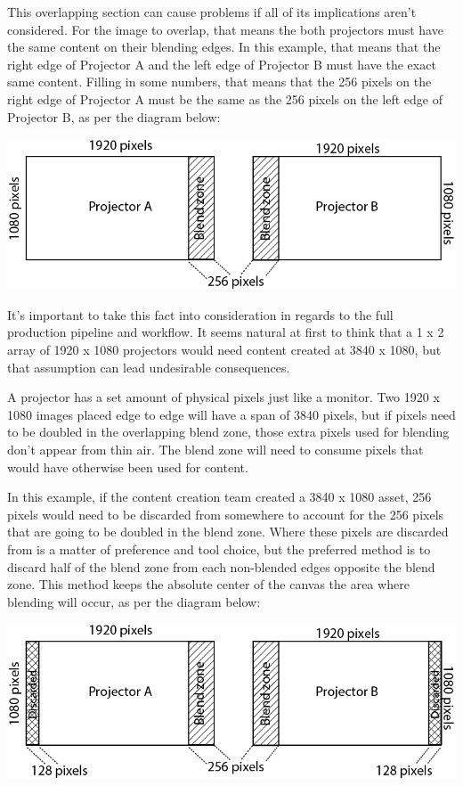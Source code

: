 \begin{fullwidth}
This overlapping section can cause problems if all of its implications aren't considered. For the image to overlap, that means the both projectors must have the same content on their blending edges. In this example, that means that the right edge of Projector A and the left edge of Projector B must have the exact same content. Filling in some numbers, that means that the 256 pixels on the right edge of Projector A must be the same as the 256 pixels on the left edge of Projector B, as per the diagram below:

\begin{center}
\includegraphics{./img/10.5/blended_edge_layout.png}
\end{center}

It's important to take this fact into consideration in regards to the full production pipeline and workflow. It seems natural at first to think that a 1 x 2 array of 1920 x 1080 projectors would need content created at 3840 x 1080, but that assumption can lead undesirable consequences.

A projector has a set amount of physical pixels just like a monitor. Two 1920 x 1080 images placed edge to edge will have a span of 3840 pixels, but if pixels need to be doubled in the overlapping blend zone, those extra pixels used for blending don't appear from thin air. The blend zone will need to consume pixels that would have otherwise been used for content. 

In this example, if the content creation team created a 3840 x 1080 asset, 256 pixels would need to be discarded from somewhere to account for the 256 pixels that are going to be doubled in the blend zone. Where these pixels are discarded from is a matter of preference and tool choice, but the preferred method is to discard half of the blend zone from each non-blended edges opposite the blend zone. This method keeps the absolute center of the canvas the area where blending will occur, as per the diagram below:

\begin{center}
\includegraphics{./img/10.5/discarded_edge_layout.png}
\end{center}


\end{fullwidth}
